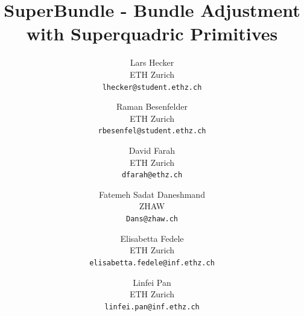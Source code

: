 \documentclass[10pt,twocolumn,letterpaper]{article}
\title{SuperBundle - Bundle Adjustment with Superquadric Primitives}
\author{Lars Hecker\\
ETH Zurich\\
{\tt\small lhecker@student.ethz.ch}
\and
Raman Besenfelder\\
ETH Zurich\\
{\tt\small rbesenfel@student.ethz.ch}
\and
David Farah\\
ETH Zurich\\
{\tt\small dfarah@ethz.ch}
\and
Fatemeh Sadat Daneshmand\\
ZHAW\\
{\tt\small Dans@zhaw.ch}
\and
Elisabetta Fedele\\
ETH Zurich\\
{\tt\small elisabetta.fedele@inf.ethz.ch}
\and
Linfei Pan\\
ETH Zurich\\
{\tt\small linfei.pan@inf.ethz.ch}
}
\begin{document}
\maketitle
    





{
    \small
    
    
}
\end{document}
